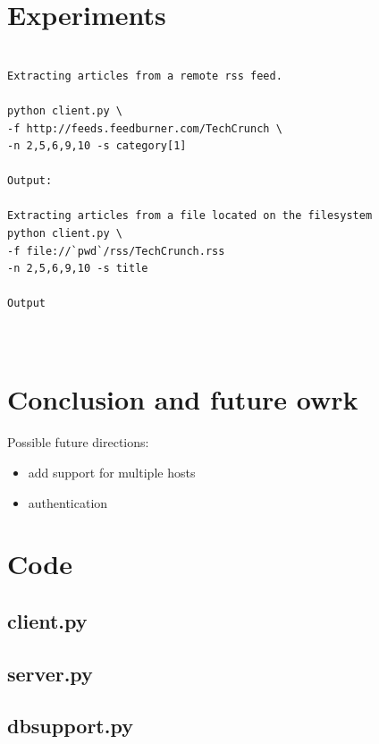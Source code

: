 \documentclass[a4paper,12pt]{article}
\begin{document}
\section{Experiments}

\begin{verbatim}

Extracting articles from a remote rss feed.

python client.py \
-f http://feeds.feedburner.com/TechCrunch \
-n 2,5,6,9,10 -s category[1]

Output:

Extracting articles from a file located on the filesystem
python client.py \
-f file://`pwd`/rss/TechCrunch.rss
-n 2,5,6,9,10 -s title

Output

 
\end{verbatim}



\section{Conclusion and future owrk}

Possible future directions:
\begin{itemize}
 \item add support for multiple hosts
 \item authentication
\end{itemize}


\section{Code}

\subsection{client.py}
\begin{alltt}

\end{alltt}

\subsection{server.py}
\begin{alltt}

\end{alltt}


\subsection{dbsupport.py}
\begin{alltt}

\end{alltt}





% 
% 
% 
% 
% 
% 
\end{document}
